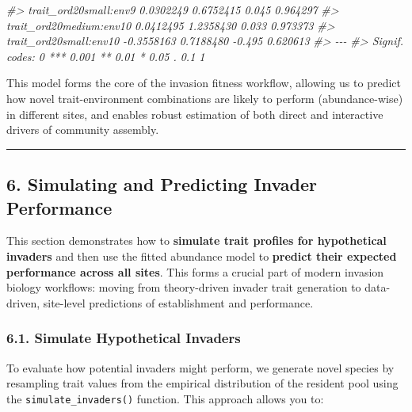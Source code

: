 \documentclass[
]{article}
\newenvironment{Shaded}{\begin{snugshade}}{\end{snugshade}}
\newcommand{\CommentTok}[1]{\textcolor[rgb]{0.56,0.35,0.01}{\textit{#1}}}
\begin{document}
\begin{Shaded}
\begin{Highlighting}[]
\CommentTok{\#\textgreater{} trait\_ord20small:env9          0.0302249  0.6752415   0.045 0.964297    }
\CommentTok{\#\textgreater{} trait\_ord20medium:env10        0.0412495  1.2358430   0.033 0.973373    }
\CommentTok{\#\textgreater{} trait\_ord20small:env10        {-}0.3558163  0.7188480  {-}0.495 0.620613    }
\CommentTok{\#\textgreater{} {-}{-}{-}}
\CommentTok{\#\textgreater{} Signif. codes:  0 \textquotesingle{}***\textquotesingle{} 0.001 \textquotesingle{}**\textquotesingle{} 0.01 \textquotesingle{}*\textquotesingle{} 0.05 \textquotesingle{}.\textquotesingle{} 0.1 \textquotesingle{} \textquotesingle{} 1}
\end{Highlighting}
\end{Shaded}

This model forms the core of the invasion fitness workflow, allowing us
to predict how novel trait-environment combinations are likely to
perform (abundance-wise) in different sites, and enables robust
estimation of both direct and interactive drivers of community assembly.

\begin{center}\rule{0.5\linewidth}{0.5pt}\end{center}

\hypertarget{simulating-and-predicting-invader-performance}{%
\subsection{6. Simulating and Predicting Invader
Performance}\label{simulating-and-predicting-invader-performance}}

This section demonstrates how to \textbf{simulate trait profiles for
hypothetical invaders} and then use the fitted abundance model to
\textbf{predict their expected performance across all sites}. This forms
a crucial part of modern invasion biology workflows: moving from
theory-driven invader trait generation to data-driven, site-level
predictions of establishment and performance.

\hypertarget{simulate-hypothetical-invaders}{%
\subsubsection{6.1. Simulate Hypothetical
Invaders}\label{simulate-hypothetical-invaders}}

To evaluate how potential invaders might perform, we generate novel
species by resampling trait values from the empirical distribution of
the resident pool using the \texttt{simulate\_invaders()} function. This
approach allows you to:
\end{document}
